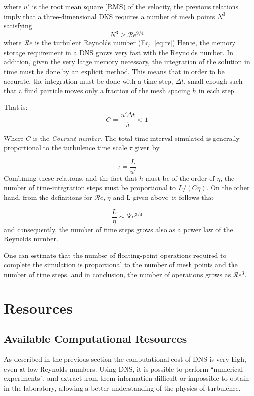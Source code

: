 where $u'$ is the root mean square (RMS) of the velocity, the previous relations imply that a three-dimensional DNS requires a number of mesh points  $N^3$ satisfying 
\begin{equation}
N^3 \ge \mathcal{R}e^{9/4}
\end{equation}
where $\mathcal{R}e$ is the turbulent Reynolds number (Eq.~\ref{eq:re}) 
Hence, the memory storage requirement in a DNS grows very fast with the Reynolds number.
In addition, given the very large memory necessary, the integration of the solution in time must be done 
by an explicit method. This means that in order to be accurate, the integration must be done with a time 
step, $\Delta t$, small enough such that a fluid particle moves only a fraction of the mesh spacing $h$ in each step.

That is:
\begin{equation}
C=\frac{u'\Delta t}{h} < 1
\label{eq:courant}
\end{equation}

Where $C$ is the \textit{Courant number}.
The total time interval simulated is generally proportional to the turbulence time scale $\tau$ given by

\begin{equation}
\tau = \frac{L}{u'}
\end{equation}
Combining these relations, and the fact that $h$ must be of the order of $\eta$, the number of time-integration steps must be proportional to $L/(C\eta)$. On the other hand, from the definitions for $\mathcal{R}e$, $\eta$ and L given above, it follows that

\begin{equation}
\frac{L}{\eta} \sim \mathcal{R}e^{3/4}
\end{equation}
and consequently, the number of time steps grows also as a power law of the Reynolds number.

One can estimate that the number of floating-point operations required to complete the simulation is proportional to the number of mesh points and the number of time steps, and in conclusion, the number of operations grows as $\mathcal{R}e^3$.

\section{Resources}

\subsection{Available Computational Resources }
As described in the previous section the computational cost of DNS is very high, even at low Reynolds numbers.
Using DNS, it is possible to perform ``numerical experiments'', and extract from them information difficult or impossible to obtain in the laboratory, allowing a better understanding of the physics of turbulence.


